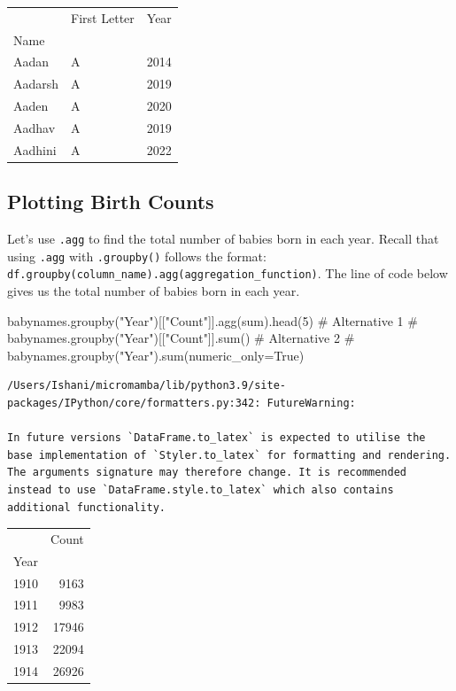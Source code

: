 \documentclass[
  letterpaper,
  DIV=11,
  numbers=noendperiod]{scrreprt}
\newenvironment{Shaded}{\begin{snugshade}}{\end{snugshade}}
\newcommand{\BuiltInTok}[1]{\textcolor[rgb]{0.00,0.23,0.31}{#1}}
\newcommand{\CommentTok}[1]{\textcolor[rgb]{0.37,0.37,0.37}{#1}}
\newcommand{\DecValTok}[1]{\textcolor[rgb]{0.68,0.00,0.00}{#1}}
\newcommand{\NormalTok}[1]{\textcolor[rgb]{0.00,0.23,0.31}{#1}}
\newcommand{\StringTok}[1]{\textcolor[rgb]{0.13,0.47,0.30}{#1}}
\begin{document}
\begin{tabular}{llr}
\toprule
{} & First Letter &  Year \\
Name    &              &       \\
\midrule
Aadan   &            A &  2014 \\
Aadarsh &            A &  2019 \\
Aaden   &            A &  2020 \\
Aadhav  &            A &  2019 \\
Aadhini &            A &  2022 \\
\bottomrule
\end{tabular}

\hypertarget{plotting-birth-counts}{%
\subsection{Plotting Birth Counts}\label{plotting-birth-counts}}

Let's use \texttt{.agg} to find the total number of babies born in each
year. Recall that using \texttt{.agg} with \texttt{.groupby()} follows
the format:
\texttt{df.groupby(column\_name).agg(aggregation\_function)}. The line
of code below gives us the total number of babies born in each year.

\begin{Shaded}
\begin{Highlighting}[]
\NormalTok{babynames.groupby(}\StringTok{"Year"}\NormalTok{)[[}\StringTok{"Count"}\NormalTok{]].agg(}\BuiltInTok{sum}\NormalTok{).head(}\DecValTok{5}\NormalTok{)}
\CommentTok{\# Alternative 1}
\CommentTok{\# babynames.groupby("Year")[["Count"]].sum()}
\CommentTok{\# Alternative 2}
\CommentTok{\# babynames.groupby("Year").sum(numeric\_only=True)}
\end{Highlighting}
\end{Shaded}

\begin{verbatim}
/Users/Ishani/micromamba/lib/python3.9/site-packages/IPython/core/formatters.py:342: FutureWarning:

In future versions `DataFrame.to_latex` is expected to utilise the base implementation of `Styler.to_latex` for formatting and rendering. The arguments signature may therefore change. It is recommended instead to use `DataFrame.style.to_latex` which also contains additional functionality.
\end{verbatim}

\begin{tabular}{lr}
\toprule
{} &  Count \\
Year &        \\
\midrule
1910 &   9163 \\
1911 &   9983 \\
1912 &  17946 \\
1913 &  22094 \\
1914 &  26926 \\
\bottomrule
\end{tabular}
\end{document}
